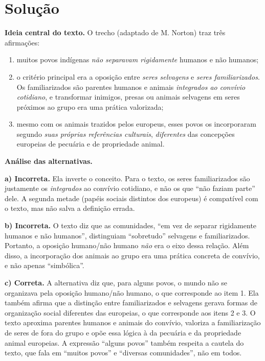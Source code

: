 \documentclass{article}%
\begin{document}
\section*{Solução}

\textbf{Ideia central do texto.} O trecho (adaptado de M. Norton) traz três afirmações:
\begin{enumerate}
\item muitos povos indígenas \emph{não separavam rigidamente} humanos e não humanos;
\item o critério principal era a oposição entre \emph{seres selvagens} e \emph{seres familiarizados}. Os familiarizados são parentes humanos e animais \emph{integrados ao convívio cotidiano}, e transformar inimigos, presas ou animais selvagens em seres próximos ao grupo era uma prática valorizada;
\item mesmo com os animais trazidos pelos europeus, esses povos os incorporaram segundo \emph{suas próprias referências culturais}, \emph{diferentes} das concepções europeias de pecuária e de propriedade animal.
\end{enumerate}

\textbf{Análise das alternativas.}

\textbf{a) Incorreta.} Ela inverte o conceito. Para o texto, os seres familiarizados são justamente os \emph{integrados} ao convívio cotidiano, e não os que ``não faziam parte'' dele. A segunda metade (papéis sociais distintos dos europeus) é compatível com o texto, mas não salva a definição errada.

\textbf{b) Incorreta.} O texto diz que as comunidades, ``em vez de separar rigidamente humanos e não humanos'', distinguiam ``sobretudo'' selvagens e familiarizados. Portanto, a oposição humano/não humano \emph{não} era o eixo dessa relação. Além disso, a incorporação dos animais ao grupo era uma prática concreta de convívio, e não apenas ``simbólica''.

\textbf{c) Correta.} A alternativa diz que, para alguns povos, o mundo não se organizava pela oposição humano/não humano, o que corresponde ao item 1. Ela também afirma que a distinção entre familiarizados e selvagens gerava formas de organização social diferentes das europeias, o que corresponde aos itens 2 e 3. O texto aproxima parentes humanos e animais do convívio, valoriza a familiarização de seres de fora do grupo e opõe essa lógica à da pecuária e da propriedade animal europeias. A expressão ``alguns povos'' também respeita a cautela do texto, que fala em ``muitos povos'' e ``diversas comunidades'', não em todos.
\end{document}
